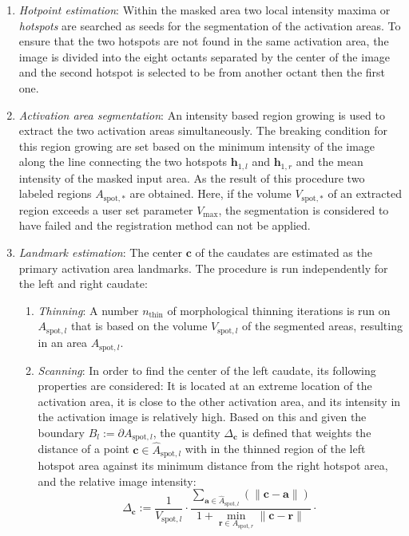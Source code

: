 \documentclass{frontiers}
\newcommand{\emitem}[1]{\item \emph{#1}}
\newcommand{\pc}{\ensuremath{\mathbf{c}}}
\newcommand{\pa}{\ensuremath{\mathbf{a}}}
\newcommand{\pr}{\ensuremath{\mathbf{r}}}
\newcommand{\hp}[1]{\ensuremath{\mathbf{h}_{#1}}}
\newcounter{myalgorithm}
\newenvironment{myalgorithm}[1][]{%
  \begin{mdframed}[style=algstyle,frametitle={\refstepcounter{myalgorithm}Algorithm \themyalgorithm: #1}]%
}{%
  \end{mdframed}
}
\begin{document}
\begin{myalgorithm}[Extraction of landmarks related to activation areas\label{alg:lspots}]
  \begin{enumerate}
  \emitem{Hotpoint estimation}: Within the masked area two local intensity maxima or \emph{hotspots}  are searched as seeds 
    for the segmentation of the activation areas. 
  To ensure that the two hotspots are not found in the same activation area, the image is divided into the 
    eight octants separated by the center of the image and the second hotspot is selected to be 
    from another octant then the first one. 
  \emitem{Activation area segmentation}: An intensity based region growing is used to extract the two activation 
     areas simultaneously. 
  The breaking condition for this region growing are set based on the minimum intensity of the image along the line 
    connecting the two hotspots \hp{1,l} and \hp{1,r} and the mean intensity of the masked input area.
  As the result of this procedure two labeled regions $A_{\text{spot},*}$ are obtained. 
  Here, if the volume $V_{\text{spot},*}$ of an extracted region exceeds a user set parameter $V_{\text{max}}$, 
    the segmentation is considered to have failed and the registration method can not be applied.
  \emitem{Landmark estimation}: The center $\pc$ of the caudates are estimated as the primary activation area landmarks.
    The procedure is run independently for the left and right caudate:
  \begin{enumerate}
  \emitem{Thinning}: A number $n_{\text{thin}}$ of morphological thinning iterations \citep{lee_building_1994} is run on 
    $A_{\text{spot},l}$ that is based on the volume $V_{\text{spot},l}$ of the segmented areas, 
    resulting in an area $\hat{A}_{\text{spot},l}$. 
  \emitem{Scanning}: In order to find the center of the left caudate, its following properties are considered: 
  It is located at an extreme location of the activation area, it is close to the other activation area, and 
    its intensity in the activation image is relatively high. 
  Based on this and given the boundary $B_l:= \partial A_{\text{spot},l}$, 
     the quantity $\Delta_{\pc}$ is defined that weights the distance of a point $\pc \in \hat{A}_{\text{spot},l}$ 
    with in the thinned region of the left hotspot area against its minimum distance from the right hotspot area, 
    and the relative image intensity: 
  \begin{equation}
    \Delta_{\pc} := \frac{1}{V_{\text{spot},l}} \cdot 
                   \frac{\sum_{\pa \in \hat{A}_{\text{spot},l}}(\|\pc-\pa\|) }{1 + \min_{\pr \in A_{\text{spot},r}}\|\pc-\pr\| } \cdot 

\end{equation}
\end{enumerate}
\end{enumerate}
\end{myalgorithm}
\end{document}
